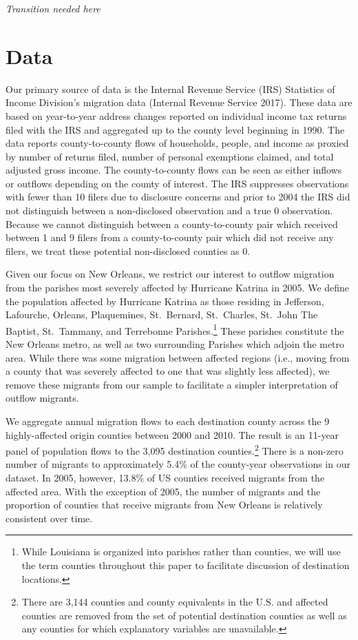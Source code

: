 \documentclass[]{article}
\let\rmarkdownfootnote\footnote%
\def\footnote{\protect\rmarkdownfootnote}
\begin{document}
\emph{Transition needed here}

\section{\texorpdfstring{Data \label{sec:data}}{Data }}\label{data}

Our primary source of data is the Internal Revenue Service (IRS)
Statistics of Income Division's migration data (Internal Revenue Service
2017). These data are based on year-to-year address changes reported on
individual income tax returns filed with the IRS and aggregated up to
the county level beginning in 1990. The data reports county-to-county
flows of households, people, and income as proxied by number of returns
filed, number of personal exemptions claimed, and total adjusted gross
income. The county-to-county flows can be seen as either inflows or
outflows depending on the county of interest. The IRS suppresses
observations with fewer than 10 filers due to disclosure concerns and
prior to 2004 the IRS did not distinguish between a non-disclosed
observation and a true 0 observation. Because we cannot distinguish
between a county-to-county pair which received between 1 and 9 filers
from a county-to-county pair which did not receive any filers, we treat
these potential non-disclosed counties as 0.

Given our focus on New Orleans, we restrict our interest to outflow
migration from the parishes most severely affected by Hurricane Katrina
in 2005. We define the population affected by Hurricane Katrina as those
residing in Jefferson, Lafourche, Orleans, Plaquemines, St.~Bernard,
St.~Charles, St.~John The Baptist, St.~Tammany, and Terrebonne
Parishes.\footnote{While Louisiana is organized into parishes rather
  than counties, we will use the term counties throughout this paper to
  facilitate discussion of destination locations.} These parishes
constitute the New Orleans metro, as well as two surrounding Parishes
which adjoin the metro area. While there was some migration between
affected regions (i.e., moving from a county that was severely affected
to one that was slightly less affected), we remove these migrants from
our sample to facilitate a simpler interpretation of outflow migrants.

We aggregate annual migration flows to each destination county across
the 9 highly-affected origin counties between 2000 and 2010. The result
is an 11-year panel of population flows to the 3,095 destination
counties.\footnote{There are 3,144 counties and county equivalents in
  the U.S. and affected counties are removed from the set of potential
  destination counties as well as any counties for which explanatory
  variables are unavailable.} There is a non-zero number of migrants to
approximately 5.4\% of the county-year observations in our dataset. In
2005, however, 13.8\% of US counties received migrants from the affected
area. With the exception of 2005, the number of migrants and the
proportion of counties that receive migrants from New Orleans is
relatively consistent over time.
\end{document}
